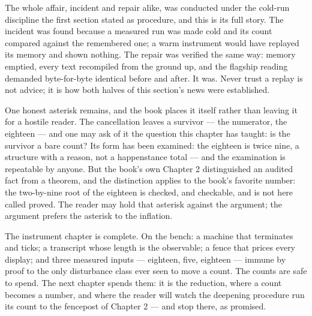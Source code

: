 The whole affair, incident and repair alike, was conducted under the cold-run
discipline the first section stated as procedure, and this is its full story. The
incident was found because a measured run was made cold and its count compared against
the remembered one; a warm instrument would have replayed its memory and shown
nothing. The repair was verified the same way: memory emptied, every text recompiled
from the ground up, and the flagship reading demanded byte-for-byte identical before
and after. It was. Never trust a replay is not advice; it is how both halves of this
section's news were established.

One honest asterisk remains, and the book places it itself rather than leaving it for
a hostile reader. The cancellation leaves a survivor --- the numerator, the eighteen
--- and one may ask of it the question this chapter has taught: is the survivor a bare
count? Its form has been examined: the eighteen is twice nine, a structure with a
reason, not a happenstance total --- and the examination is repeatable by anyone. But
the book's own Chapter 2 distinguished an audited fact from a theorem, and the
distinction applies to the book's favorite number: the two-by-nine root of the
eighteen is checked, and checkable, and is not here called proved. The reader may hold
that asterisk against the argument; the argument prefers the asterisk to the inflation.

The instrument chapter is complete. On the bench: a machine that terminates and ticks;
a transcript whose length is the observable; a fence that prices every display; and
three measured inputs --- eighteen, five, eighteen --- immune by proof to the only
disturbance class ever seen to move a count. The counts are safe to spend. The next
chapter spends them: it is the reduction, where a count becomes a number, and where
the reader will watch the deepening procedure run its count to the fencepost of
Chapter 2 --- and stop there, as promised.
